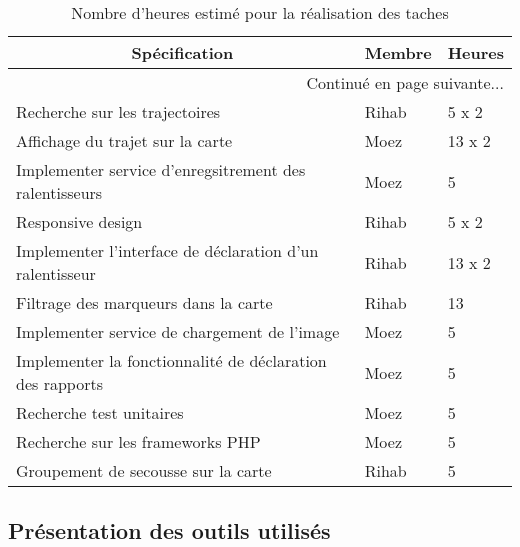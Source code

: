 \begin{center}
    \begin{longtable}{| l | l | l |}
        \caption{Nombre d'heures estimé pour la réalisation des taches}
        \label{tab:sprint2-estimation} \\

        \hline
        \multicolumn{1}{|c}{\textbf{Spécification}} &
        \multicolumn{1}{|c}{\textbf{Membre}} &
        \multicolumn{1}{|c|}{\textbf{Heures}} \\ \hline
        \endhead

        \hline \multicolumn{3}{|r|}{{Continué en page suivante$\dotsc$}} \\ \hline
        \endfoot

        \hline \hline
        \endlastfoot

        \hline
Recherche sur les trajectoires & Rihab & 5 x 2 \\ \hline
Affichage du trajet sur la carte & Moez & 13 x 2 \\ \hline
Implementer service d’enregsitrement des ralentisseurs & Moez & 5 \\ \hline
Responsive design & Rihab & 5 x 2 \\ \hline
Implementer l’interface de déclaration d'un ralentisseur & Rihab & 13 x 2 \\ \hline
Filtrage des marqueurs dans la carte & Rihab & 13 \\ \hline
Implementer service de chargement de l'image & Moez & 5 \\ \hline
Implementer la fonctionnalité de déclaration des rapports & Moez & 5 \\ \hline
Recherche test unitaires & Moez & 5 \\ \hline
Recherche sur les frameworks PHP & Moez & 5 \\ \hline
Groupement de secousse sur la carte & Rihab & 5 \\ \hline
    \end{longtable}
\end{center}


\subsection{Présentation des outils utilisés}

